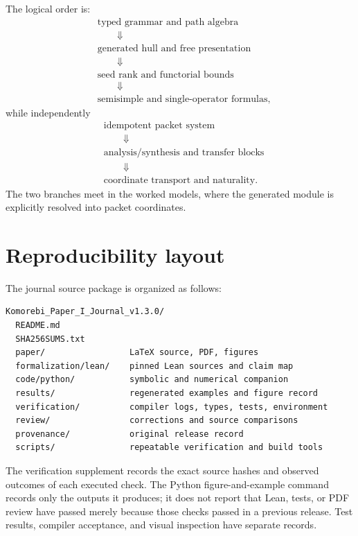 \documentclass[11pt]{article}
\theoremstyle{definition}
\theoremstyle{remark}
\begin{document}
The logical order is:
\[
\begin{aligned}
&\text{typed grammar and path algebra}\\
&\qquad\Downarrow\\
&\text{generated hull and free presentation}\\
&\qquad\Downarrow\\
&\text{seed rank and functorial bounds}\\
&\qquad\Downarrow\\
&\text{semisimple and single-operator formulas},
\end{aligned}
\]
while independently
\[
\begin{aligned}
&\text{idempotent packet system}\\
&\qquad\Downarrow\\
&\text{analysis/synthesis and transfer blocks}\\
&\qquad\Downarrow\\
&\text{coordinate transport and naturality}.
\end{aligned}
\]
The two branches meet in the worked models, where the generated module is explicitly resolved into packet coordinates.

\section{Reproducibility layout}

The journal source package is organized as follows:
\begin{lstlisting}
Komorebi_Paper_I_Journal_v1.3.0/
  README.md
  SHA256SUMS.txt
  paper/                 LaTeX source, PDF, figures
  formalization/lean/    pinned Lean sources and claim map
  code/python/           symbolic and numerical companion
  results/               regenerated examples and figure record
  verification/          compiler logs, types, tests, environment
  review/                corrections and source comparisons
  provenance/            original release record
  scripts/               repeatable verification and build tools
\end{lstlisting}

The verification supplement records the exact source hashes and observed
outcomes of each executed check. The Python figure-and-example command
records only the outputs it produces; it does not report that Lean, tests,
or PDF review have passed merely because those checks passed in a previous
release. Test results, compiler acceptance, and visual inspection have
separate records.
\end{document}
